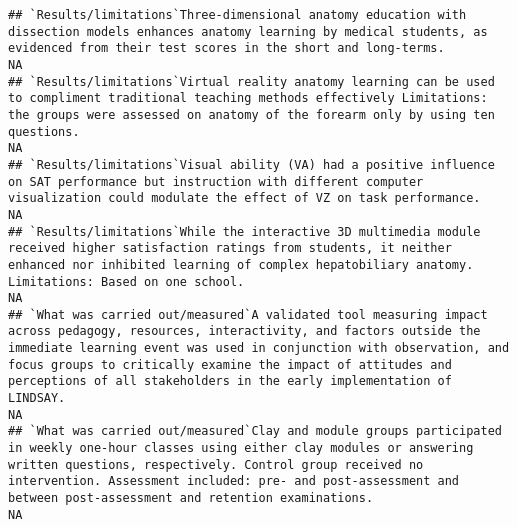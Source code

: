 \documentclass[]{article}
\begin{document}
\begin{verbatim}
## `Results/limitations`Three-dimensional anatomy education with dissection models enhances anatomy learning by medical students, as evidenced from their test scores in the short and long-terms.                                                                                                                                                                                                                                                                                       NA
## `Results/limitations`Virtual reality anatomy learning can be used to compliment traditional teaching methods effectively Limitations: the groups were assessed on anatomy of the forearm only by using ten questions.                                                                                                                                                                                                                                                                 NA
## `Results/limitations`Visual ability (VA) had a positive influence on SAT performance but instruction with different computer visualization could modulate the effect of VZ on task performance.                                                                                                                                                                                                                                                                                       NA
## `Results/limitations`While the interactive 3D multimedia module received higher satisfaction ratings from students, it neither enhanced nor inhibited learning of complex hepatobiliary anatomy. Limitations: Based on one school.                                                                                                                                                                                                                                                    NA
## `What was carried out/measured`A validated tool measuring impact across pedagogy, resources, interactivity, and factors outside the immediate learning event was used in conjunction with observation, and focus groups to critically examine the impact of attitudes and perceptions of all stakeholders in the early implementation of LINDSAY.                                                                                                                                     NA
## `What was carried out/measured`Clay and module groups participated in weekly one-hour classes using either clay modules or answering written questions, respectively. Control group received no intervention. Assessment included: pre- and post-assessment and between post-assessment and retention examinations.                                                                                                                                                                   NA

\end{verbatim}
\end{document}

